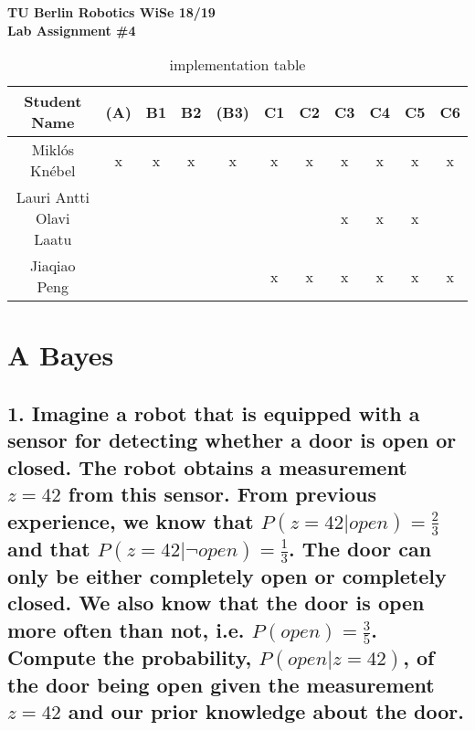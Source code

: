 \documentclass[a4paper,10pt]{article}
\begin{document}
\begin{center}
  \textbf{\Huge TU Berlin Robotics WiSe 18/19} \\
  \textbf{\huge Lab Assignment \#4}
\end{center}

\vfill

\begin{table}[h!]
  \begin{center}
    \begin{tabular}{c|c|c|c|c|c|c|c|c|c|c}
      Student Name    & \textbf{(A)} & \textbf{B1} & \textbf{B2} & \textbf{(B3)} & \textbf{C1} & \textbf{C2} & \textbf{C3} & \textbf{C4} & \textbf{C5} & \textbf{C6}\\\hline\hline
      Miklós Knébel    &       x      &       x       &       x       &       x       &       x       &       x       &       x       &      x      &      x     &      x      \\\hline
      Lauri Antti Olavi Laatu    &       ~      &       ~       &       ~       &       ~       &       ~       &       ~       &       x       &      x      &      x     &      ~      \\\hline
      Jiaqiao Peng    &       ~      &       ~       &       ~       &       ~       &       x       &       x       &       x       &      x      &      x     &      x      \\\hline
    \end{tabular}
    \caption{implementation table}
  \end{center}
\end{table}

\newpage


\section*{A Bayes}

\subsection*{1. Imagine a robot that is equipped with a sensor for detecting whether a door is open or closed. The robot obtains a measurement $z = 42$ from this sensor. From previous experience, we know that $P(z = 42 | open) = \frac{2}{3}$ and that $P(z = 42 | \neg{open}) = \frac{1}{3}$. The door can only be either completely open or completely closed. We also know that the door is open more often than not, i.e. $P(open) = \frac{3}{5}$.
Compute the probability, $P(open | z = 42)$, of the door being open given the measurement $z = 42$ and our prior knowledge about the door.}
\end{document}
